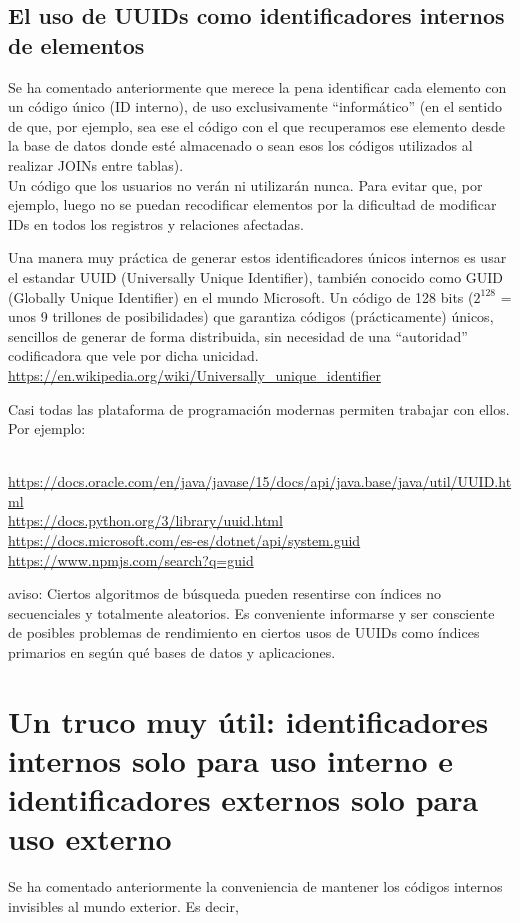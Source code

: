 \documentclass[spanish,12pt,a4paper,final,oneside]{book}
\begin{document}
\subsection{El uso de UUIDs como identificadores internos de elementos}
Se ha comentado anteriormente que merece la pena identificar cada elemento con un código único (ID interno),  de uso exclusivamente  ``informático'' (en el sentido de que, por ejemplo, sea ese el código con el que recuperamos ese elemento desde la base de datos donde esté almacenado o sean esos los códigos utilizados al realizar JOINs entre tablas). 
\\Un código que los usuarios no verán ni utilizarán nunca. Para evitar que, por ejemplo, luego no se puedan recodificar elementos por la dificultad de modificar IDs en todos los registros y relaciones afectadas.

Una manera muy práctica de generar estos identificadores únicos internos es usar el estandar UUID (Universally Unique Identifier), {\scriptsize también conocido como GUID (Globally Unique Identifier) en el mundo Microsoft}. Un código de 128 bits ($2^{128}$ = unos 9 trillones de posibilidades) que garantiza códigos (prácticamente) únicos, sencillos de generar de forma distribuida, sin necesidad de una ``autoridad'' codificadora que vele por dicha unicidad.
\\ \url{https://en.wikipedia.org/wiki/Universally_unique_identifier}

Casi todas las plataforma de programación modernas permiten trabajar con ellos. Por ejemplo:
\begin{scriptsize}
\\ \url{https://docs.oracle.com/en/java/javase/15/docs/api/java.base/java/util/UUID.html}
\\ \url{https://docs.python.org/3/library/uuid.html}
\\ \url{https://docs.microsoft.com/es-es/dotnet/api/system.guid}
\\ \url{https://www.npmjs.com/search?q=guid}
\end{scriptsize}

\vspace{1cm}

aviso: Ciertos algoritmos de búsqueda pueden resentirse con índices no secuenciales y totalmente aleatorios. Es conveniente informarse y ser consciente de posibles problemas de rendimiento en ciertos usos de UUIDs como índices primarios en según qué bases de datos y aplicaciones. 


\section{Un truco muy útil: identificadores internos solo para uso interno e identificadores externos solo para uso externo}
Se ha comentado anteriormente la conveniencia de mantener los códigos internos invisibles al mundo exterior. Es decir,
\end{document}
